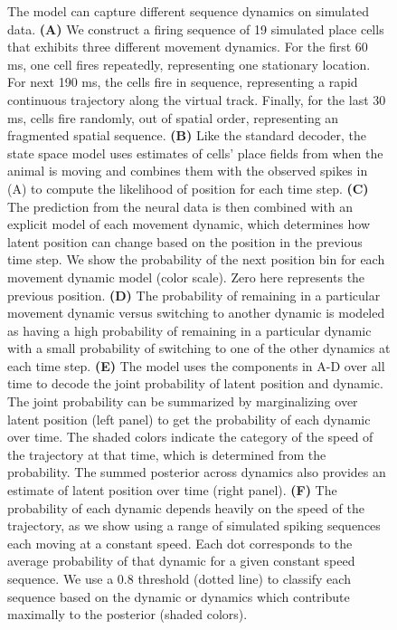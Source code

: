 \documentclass[times, twoside]{zHenriquesLab-StyleBioRxiv}
\begin{document}
\begin{figure}
\caption{The model can capture different sequence dynamics on simulated data. \textbf{(A)} We construct a firing sequence of 19 simulated place cells that exhibits three different movement dynamics. For the first 60 ms, one cell fires repeatedly, representing one stationary location. For next 190 ms, the cells fire in sequence, representing a rapid continuous trajectory along the virtual track. Finally, for the last 30 ms, cells fire randomly, out of spatial order, representing an fragmented spatial sequence. \textbf{(B)} Like the standard decoder, the state space model uses estimates of cells' place fields from when the animal is moving and combines them with the observed spikes in (A) to compute the likelihood of position for each time step. \textbf{(C)} The prediction from the neural data is then combined with an explicit model of each movement dynamic, which determines how latent position can change based on the position in the previous time step. We show the probability of the next position bin for each movement dynamic model (color scale). Zero here represents the previous position. \textbf{(D)} The probability of remaining in a particular movement dynamic versus switching to another dynamic is modeled as having a high probability of remaining in a particular dynamic with a small probability of switching to one of the other dynamics at each time step. \textbf{(E)} The model uses the components in A-D over all time to decode the joint probability of latent position and dynamic. The joint probability can be summarized by marginalizing over latent position (left panel) to get the probability of each dynamic over time. The shaded colors indicate the category of the speed of the trajectory at that time, which is determined from the probability. The summed posterior across dynamics also provides an estimate of latent position over time (right panel). \textbf{(F)} The probability of each dynamic depends heavily on the speed of the trajectory, as we show using a range of simulated spiking sequences each moving at a constant speed. Each dot corresponds to the average probability of that dynamic for a given constant speed sequence. We use a 0.8 threshold (dotted line) to classify each sequence based on the dynamic or dynamics which contribute maximally to the posterior (shaded colors).
}
\label{1}
\end{figure}
\end{document}
